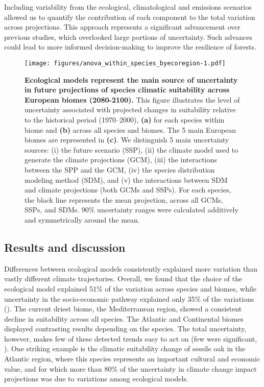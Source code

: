 \documentclass[11pt,letter]{article}
\begin{document}
Including variability from the ecological, climatological and emissions scenarios allowed us to quantify the contribution of each component to the total variation across projections. This approach represents a significant advancement over previous studies, which overlooked large portions of uncertainty. Such advances could lead to more informed decision-making to improve the resilience of forests. 

\begin{figure}
	\centering
	\texttt{[image: figures/anova\_within\_species\_byecoregion-1.pdf]}
	\caption{\textbf{Ecological models represent the main source of uncertainty in future projections of species climatic suitability across European biomes (2080-2100).} This figure illustrates the level of uncertainty associated with projected changes in suitability relative to the historical period (1970–2000), \textbf{(a)} for each species within biome and \textbf{(b)} across all species and biomes. The 5 main European biomes are represented in \textbf{(c)}. We distinguish 5 main uncertainty sources: (i) the future scenario (SSP), (ii) the climate model used to generate the climate projections (GCM), (iii) the interactions between the SPP and the GCM, (iv) the species distribution modeling method (SDM), and (v) the interactions between SDM and climate projections (both GCMs and SSPs). For each species, the black line represents the mean projection, across all GCMs, SSPs, and SDMs. 90\% uncertainty ranges were calculated additively and symmetrically around the mean.}
	\label{fig:anovaspecies}  %
\end{figure}

\subsection*{Results and discussion}

Differences between ecological models consistently explained more variation than vastly different climate trajectories. Overall, we found that the choice of the ecological model explained 51\% of the variation across species and biomes, while uncertainty in the socio-economic pathway explained only 35\% of the variations (). The current driest biome, the Mediterranean region, showed a consistent decline in suitability across all species. The Atlantic and Continental biomes displayed contrasting results depending on the species. 
The total uncertainty, however, makes few of these detected trends easy to act on (few were significant, ). One striking example is the climatic suitability change of sessile oak in the Atlantic region, where this species represents an important cultural and economic value, and for which more than 80\% of the uncertainty in climate change impact projections was due to variations among ecological models. 
\end{document}
